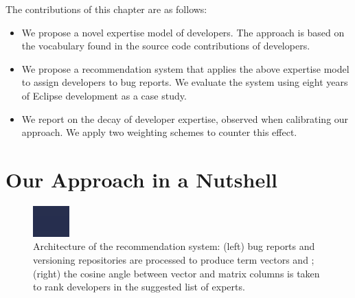\documentclass[10pt]{book}
\begin{document}
The contributions of this chapter are as follows:
\begin{itemize}
\item We propose a novel expertise model of developers. The approach is based on the vocabulary found in the source code contributions of developers.

\item We propose a recommendation system that applies the above expertise model to assign developers to bug reports. We evaluate the system using eight years of Eclipse development as a case study. 

\item We report on the decay of developer expertise, observed when calibrating our approach. We apply two weighting schemes to counter this effect.
\end{itemize}

\section{Our Approach in a Nutshell}\label{sec:nutshell}

\begin{figure}
    \includegraphics[width=\linewidth]{FlowOfAlgo}
    \caption{Architecture of the \DEVLECT recommendation system: (left) bug reports and versioning repositories are processed to produce term vectors and \TAMS; (right) the cosine angle between vector and matrix columns is taken to rank developers in the suggested list of experts.}
    \label{fig:algo}
\end{figure} 
\end{document}
